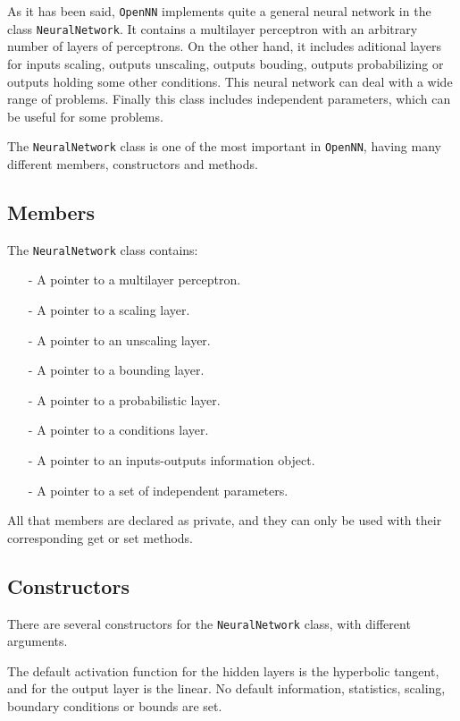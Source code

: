 
As it has been said, \texttt{OpenNN} implements quite a general neural network in the class \lstinline"NeuralNetwork". 
It contains a multilayer perceptron with an arbitrary number of layers of perceptrons. 
On the other hand, it includes aditional layers for inputs scaling, outputs unscaling, outputs bouding, outputs probabilizing
or outputs holding some other conditions. 
This neural network can deal with a wide range of problems. 
Finally this class includes independent parameters, which can be useful for some problems. 

The \lstinline"NeuralNetwork" class is one of the most important in \texttt{OpenNN}, having many different members, constructors and methods. 

\subsection*{Members}

The \lstinline"NeuralNetwork" class contains:

\begin{itemize}
\item[-] A pointer to a multilayer perceptron.
\item[-] A pointer to a scaling layer.
\item[-] A pointer to an unscaling layer.
\item[-] A pointer to a bounding layer.
\item[-] A pointer to a probabilistic layer.
\item[-] A pointer to a conditions layer.
\item[-] A pointer to an inputs-outputs information object.
\item[-] A pointer to a set of independent parameters.
\end{itemize}

All that members are declared as private, and they can only be used with their corresponding get or set methods. 

\subsection*{Constructors}

There are several constructors for the \lstinline"NeuralNetwork" class, with different arguments. 

The default activation function for the hidden layers is the hyperbolic tangent, and for the output layer is the linear. No default information, statistics, scaling, boundary conditions or bounds are set.

